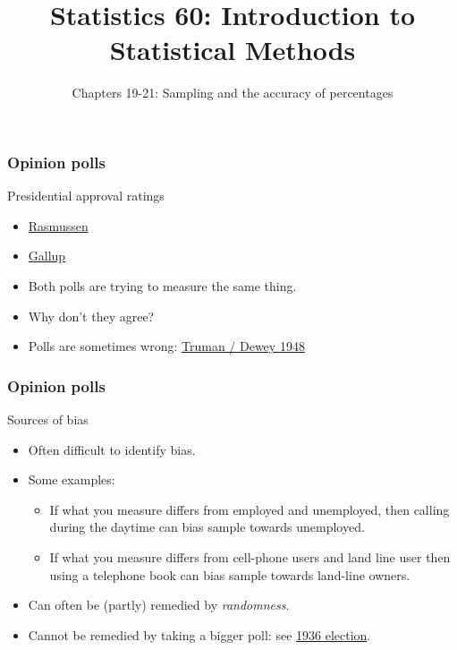 \documentclass[handout]{beamer}
\title{Statistics 60: Introduction to Statistical Methods}
\subtitle{Chapters 19-21: Sampling and the accuracy of percentages}
\author{}%
\begin{document}
   \begin{frame}
   \titlepage
   \end{frame}


   \begin{frame} \frametitle{Opinion polls}

   \begin{block}
   {Presidential approval ratings}
   \begin{itemize}
   \item \href{http://www.rasmussenreports.com/public\string_content/politics/obama\string_administration/daily\string_presidential\string_tracking\string_poll}{{\color{blue} Rasmussen}}
   \item \href{http://www.gallup.com/poll/113980/gallup-daily-obama-job-approval.aspx}{{\color{blue} Gallup}}
   \item Both polls are trying to measure the same thing.
   \item Why don't they agree?
   \item Polls are sometimes wrong: \href{http://www.chicagotribune.com/news/politics/chi-chicagodays-deweydefeats-story,0,6484067.story}{{\color{blue} Truman / Dewey 1948}}
   \end{itemize}
   \end{block}
   \end{frame}


   \begin{frame} \frametitle{Opinion polls}

   \begin{block}
   {Sources of bias}
   \begin{itemize}
   \item Often difficult to identify bias.
   \item Some examples:
      \begin{itemize}
      \item If what you measure differs from employed and unemployed, then
      calling during the daytime can bias sample towards unemployed.
      \item If what you measure differs from cell-phone users and
      land line user then using a telephone book can bias sample
      towards land-line owners.
      \end{itemize}
   \item Can often be (partly) remedied by {\em randomness}.
   \item Cannot be remedied by taking a bigger poll: see \href{http://en.wikipedia.org/wiki/United_States_presidential_election,_1936}{{\color{blue} 1936 election}}.
   \end{itemize}
   \end{block}
   \end{frame}
\end{document}

